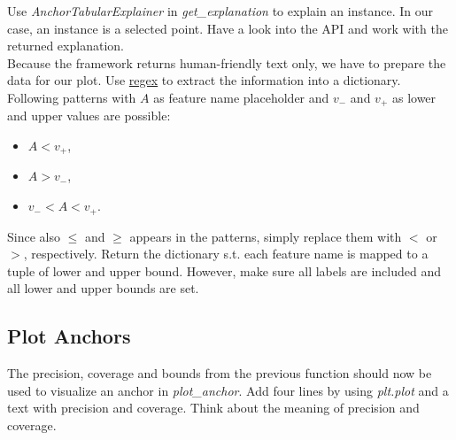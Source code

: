 \documentclass[a4paper]{article}
\begin{document}
Use \textit{AnchorTabularExplainer} in \textit{get\_explanation} to explain an instance. In our case, an instance is a selected point. Have a look into the API and work with the returned explanation.\\

\noindent Because the framework returns human-friendly text only, we have to prepare the data for our plot. Use \href{https://docs.python.org/3/howto/regex.html}{regex} to extract the information into a dictionary. Following patterns with $A$ as feature name placeholder and $v_-$ and $v_+$ as lower and upper values are possible:

\begin{itemize}
    \item $A < v_+$,
    \item $A > v_-$,
    \item $v_- < A < v_+$.
\end{itemize}

\noindent Since also $\leq$ and $\geq$ appears in the patterns, simply replace them with $<$ or $>$, respectively. Return the dictionary s.t. each feature name is mapped to a tuple of lower and upper bound. However, make sure all labels are included and all lower and upper bounds are set.


\subsection{Plot Anchors}

The precision, coverage and bounds from the previous function should now be used to visualize an anchor in \textit{plot\_anchor}. Add four lines by using \textit{plt.plot} and a text with precision and coverage. Think about the meaning of precision and coverage.
\end{document}
